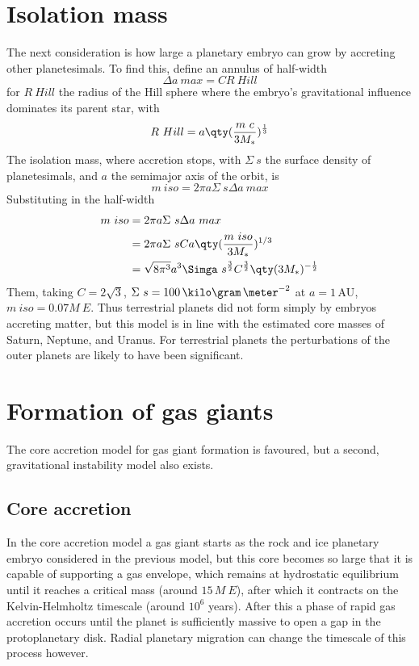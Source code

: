 \section{Isolation mass}
\label{sec:isolation-mass}

The next consideration is how large a planetary embryo can grow by
accreting other planetesimals. To find this, define an annulus of
half-width
\[ \Delta a~{max} = C R~{Hill} \] for $R~{Hill}$ the radius of the
Hill sphere where the embryo's gravitational influence dominates its
parent star, with
\begin{equation}
  \label{eq:48}
  R~{Hill} = a \qty( \frac{m~c}{3 M_{*}} )^{\frac{1}{3}}
\end{equation}
The isolation mass, where accretion stops, with $\Sigma~s$ the surface density of planetesimals, and $a$ the semimajor axis of the orbit, is
\begin{equation}
  \label{eq:49}
  m~{iso} = 2 \pi a \Sigma~s \Delta a~{max}
\end{equation}
Substituting in the half-width
\begin{align*}
  m~{iso} &= 2 \pi a \Sigma~s \Delta a~{max} \\
&= 2 \pi a \Sigma~s C a \qty( \frac{m~{iso}}{3 M_{*}} )^{1/3} \\
&= \sqrt{8 \pi^3} a^3 \Simga~s^{\frac{3}{2}} C^{\frac{3}{2}} \qty( 3 M_{*})^{- \frac{1}{2}}
\end{align*}
Them, taking $C=2 \sqrt{3}$, $\Sigma~s = 100\,\kilo\gram\,\meter^{-2}$
at $a = 1\,\text{AU}$, $m~{iso} = 0.07 M~E$. Thus terrestrial planets
did not form simply by embryos accreting matter, but this model is in
line with the estimated core masses of Saturn, Neptune, and
Uranus. For terrestrial planets the perturbations of the outer planets
are likely to have been significant.

\section{Formation of gas giants}
\label{sec:formation-gas-giants}

The core accretion model for gas giant formation is favoured, but a
second, gravitational instability model also exists.

\subsection{Core accretion}
\label{sec:core-accretion}

In the core accretion model a gas giant starts as the rock and ice
planetary embryo considered in the previous model, but this core
becomes so large that it is capable of supporting a gas envelope,
which remains at hydrostatic equilibrium until it reaches a critical
mass (around $15\,M~E$), after which it contracts on the
Kelvin-Helmholtz timescale (around $10^6$ years). After this a phase
of rapid gas accretion occurs until the planet is sufficiently massive
to open a gap in the protoplanetary disk. Radial planetary migration
can change the timescale of this process however.


